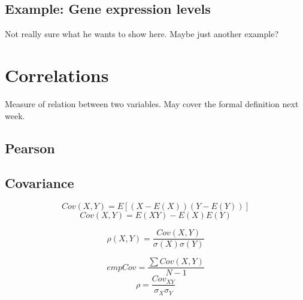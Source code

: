 \documentclass[a4paper]{article}
\begin{document}


\subsection{Example: Gene expression levels}

Not really sure what he wants to show here. Maybe just another example?

\section{Correlations}

Measure of relation between two variables. May cover the formal definition next week.

\subsection{Pearson}

\subsection{Covariance}

\[Cov(X,Y)=E[(X-E(X))(Y-E(Y))]\]
\[Cov(X,Y)=E(XY)-E(X)E(Y)\]

\[\rho(X,Y)=\frac{Cov(X,Y)}{\sigma(X)\sigma(Y)}\]

\[empCov=\frac{\sum Cov(X,Y)}{N-1}\]
\[\rho = \frac{Cov_{XY}}{\sigma_X \sigma_Y}\]
\end{document}
